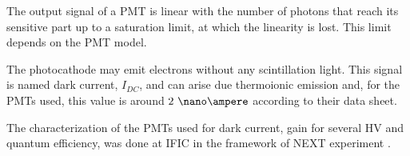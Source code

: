 The output signal of a PMT is linear with the number of photons that reach its sensitive part up to a saturation limit, at which the linearity is lost. This limit depends on the PMT model.

The photocathode may emit electrons without any scintillation light. This signal is named dark current, $I_{DC}$, and can  arise due thermoionic emission and, for the PMTs used, this value is around $2~\nano\ampere$ according to their data sheet.

The characterization of the PMTs used for dark current, gain for several HV and quantum efficiency,  was done at IFIC in the framework of NEXT experiment \cite{CalibrationPMTsNEXT}. 